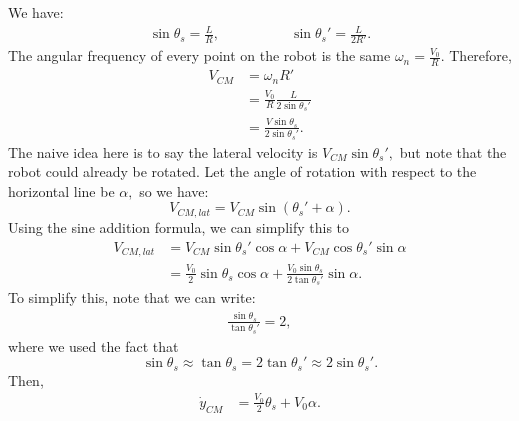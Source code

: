 \documentclass{article}
\numberwithin{equation}{section}
\begin{document}
\begin{enumerate}[label=\textbf{1.\arabic*}]
\begin{center}
    \end{center}
    We have:
    \begin{align}
        \sin\theta_s = \frac{L}{R},\quad\quad\quad\quad\quad \sin\theta_s' = \frac{L}{2R'}.
    \end{align}
    The angular frequency of every point on the robot is the same $\omega_n = \frac{V_0}{R}.$ Therefore,
    \begin{align}
        V_{CM} &= \omega_n R' \\ 
        &= \frac{V_0}{R} \frac{L}{2\sin\theta_s'} \\ 
        &= \frac{V\sin\theta_s}{2\sin\theta_s'}.
    \end{align}
    The naive idea here is to say the lateral velocity is $V_{CM}\sin\theta_s',$ but note that the robot could already be rotated. Let the angle of rotation with respect to the horizontal line be $\alpha,$ so we have:
    \begin{equation}
        V_{CM,lat} = V_{CM}\sin(\theta_s' + \alpha).
    \end{equation}
    Using the sine addition formula, we can simplify this to 
    \begin{align}
        V_{CM,lat} &= V_{CM}\sin\theta_s'\cos\alpha + V_{CM}\cos\theta_s'\sin\alpha \\
        &=\frac{V_0}{2}\sin\theta_s \cos\alpha + \frac{V_0\sin\theta_s}{2\tan\theta_s'}\sin\alpha.
    \end{align}
    To simplify this, note that we can write:
    \begin{align}
        \frac{\sin\theta_s}{\tan\theta_s'} = 2,
    \end{align}
    where we used the fact that 
    \begin{equation}
        \sin\theta_s \approx \tan\theta_s = 2\tan\theta_s' \approx 2\sin\theta_s'.
    \end{equation}
    Then,
    \begin{align}
        \dot{y}_{CM} &= \frac{V_0}{2}\theta_s + V_0\alpha.
    \end{align}

\end{enumerate}
\end{document}
